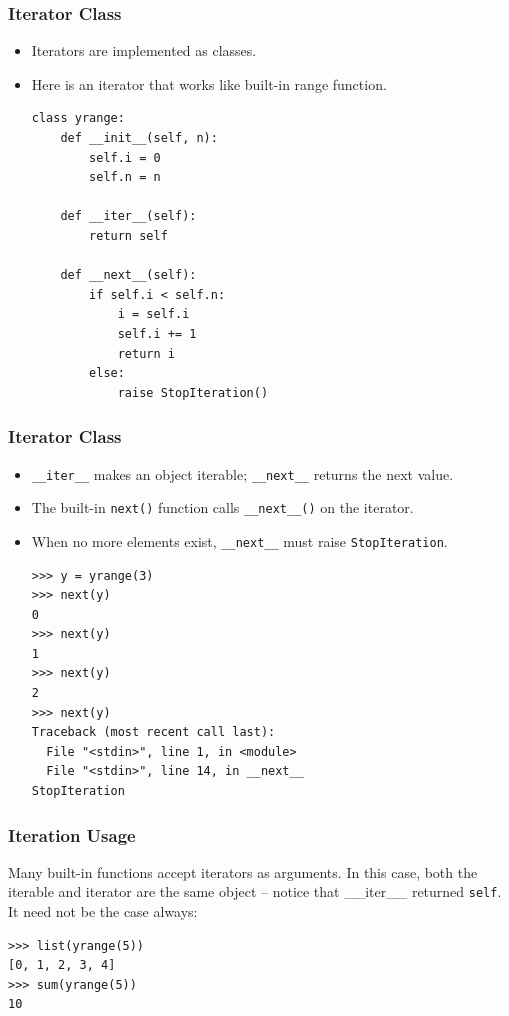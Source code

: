 \begin{frame}[fragile]\frametitle{Iterator Class}
    \begin{itemize}
    \item Iterators are implemented as classes. 
    \item Here is an iterator that works like built-in range function.
	\begin{lstlisting}
class yrange:
    def __init__(self, n):
        self.i = 0
        self.n = n

    def __iter__(self):
        return self

    def __next__(self):
        if self.i < self.n:
            i = self.i
            self.i += 1
            return i
        else:
            raise StopIteration()
\end{lstlisting}
    \end{itemize}
\end{frame}

\begin{frame}[fragile]\frametitle{Iterator Class}
    \begin{itemize}
    \item \lstinline|__iter__| makes an object iterable; \lstinline|__next__| returns the next value.
    \item The built-in \lstinline|next()| function calls \lstinline|__next__()| on the iterator.
    \item When no more elements exist, \lstinline|__next__| must raise \lstinline|StopIteration|.
	\begin{lstlisting}
>>> y = yrange(3)
>>> next(y)
0
>>> next(y)
1
>>> next(y)
2
>>> next(y)
Traceback (most recent call last):
  File "<stdin>", line 1, in <module>
  File "<stdin>", line 14, in __next__
StopIteration
\end{lstlisting}
    \end{itemize}
\end{frame}

\begin{frame}[fragile]\frametitle{Iteration Usage}
Many built-in functions accept iterators as arguments. In this case, both the iterable and
iterator are the same object -- notice that \_\_iter\_\_ returned \lstinline|self|. It need not
be the case always:
\begin{lstlisting}
>>> list(yrange(5))
[0, 1, 2, 3, 4]
>>> sum(yrange(5))
10
\end{lstlisting}
\end{frame}


